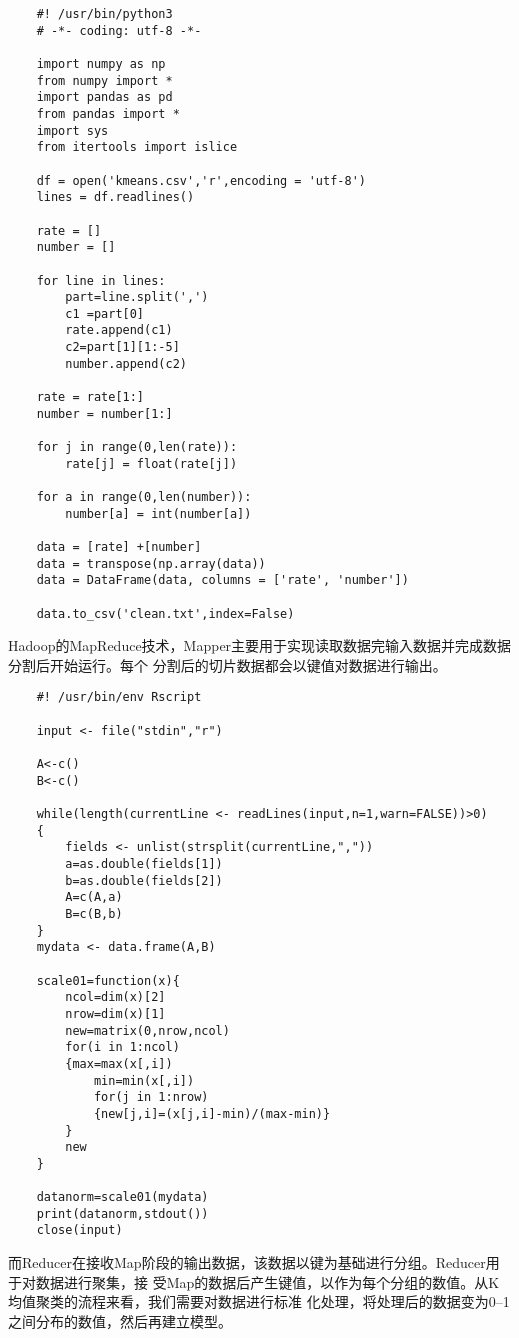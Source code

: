\begin{lstlisting}
	#! /usr/bin/python3
	# -*- coding: utf-8 -*-

	import numpy as np
	from numpy import *
	import pandas as pd
	from pandas import *
	import sys
	from itertools import islice

	df = open('kmeans.csv','r',encoding = 'utf-8')
	lines = df.readlines()

	rate = []
	number = []

	for line in lines:
	    part=line.split(',')
	    c1 =part[0]
	    rate.append(c1)
	    c2=part[1][1:-5]
	    number.append(c2)

	rate = rate[1:]
	number = number[1:]

	for j in range(0,len(rate)):
	    rate[j] = float(rate[j])

	for a in range(0,len(number)):
	    number[a] = int(number[a])

	data = [rate] +[number]
	data = transpose(np.array(data))
	data = DataFrame(data, columns = ['rate', 'number'])

	data.to_csv('clean.txt',index=False)
\end{lstlisting}

Hadoop的MapReduce技术，Mapper主要用于实现读取数据完输入数据并完成数据分割后开始运行。每个
分割后的切片数据都会以键值对数据进行输出。

\begin{lstlisting}
	#! /usr/bin/env Rscript

	input <- file("stdin","r")

	A<-c()
	B<-c()

	while(length(currentLine <- readLines(input,n=1,warn=FALSE))>0)
	{
	    fields <- unlist(strsplit(currentLine,","))
	    a=as.double(fields[1])
	    b=as.double(fields[2])
	    A=c(A,a)
	    B=c(B,b)
	}
	mydata <- data.frame(A,B)

	scale01=function(x){
	    ncol=dim(x)[2]
	    nrow=dim(x)[1]
	    new=matrix(0,nrow,ncol)
	    for(i in 1:ncol)
	    {max=max(x[,i])
	        min=min(x[,i])
	        for(j in 1:nrow)
	        {new[j,i]=(x[j,i]-min)/(max-min)}
	    }
	    new
	}

	datanorm=scale01(mydata)
	print(datanorm,stdout())
	close(input)
\end{lstlisting}

而Reducer在接收Map阶段的输出数据，该数据以键为基础进行分组。Reducer用于对数据进行聚集，接
受Map的数据后产生键值，以作为每个分组的数值。从K均值聚类的流程来看，我们需要对数据进行标准
化处理，将处理后的数据变为0--1之间分布的数值，然后再建立模型。

